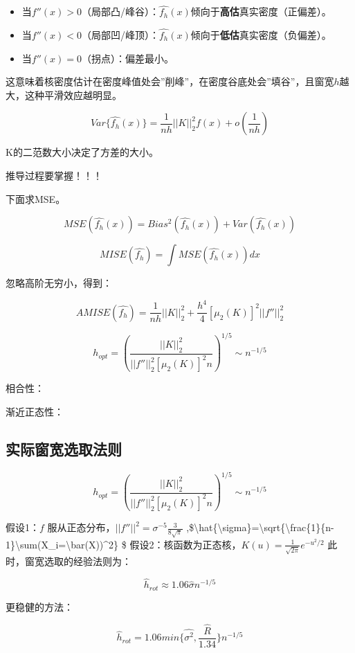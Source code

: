 \documentclass[
]{book}
\providecommand{\tightlist}{%
  \setlength{\itemsep}{0pt}\setlength{\parskip}{0pt}}
\begin{document}
\begin{itemize}
\tightlist
\item
  当\(f''(x) > 0\)（局部凸/峰谷）：\(\hat{f_h}(x)\)倾向于\textbf{高估}真实密度（正偏差）。
\item
  当\(f''(x) < 0\)（局部凹/峰顶）：\(\hat{f_h}(x)\)倾向于\textbf{低估}真实密度（负偏差）。
\item
  当\(f''(x) = 0\)（拐点）：偏差最小。
\end{itemize}

这意味着核密度估计在密度峰值处会''削峰''，在密度谷底处会''填谷''，且窗宽\(h\)越大，这种平滑效应越明显。

\[
Var\{\hat{f_h}(x) \}=\frac{1}{nh}||K||^2_2f(x)+o(\frac{1}{nh})
\]

K的二范数大小决定了方差的大小。

推导过程要掌握！！！

下面求MSE。

\[
MSE(\hat{f_h}(x))=Bias^2(\hat{f_h}(x))+Var(\hat{f_h}(x))
\]

\[
MISE(\hat{f_h})=\int MSE(\hat{f_h}(x))dx
\]

忽略高阶无穷小，得到：

\[
AMISE(\hat{f_h})=\frac{1}{nh}||K||^2_2+\frac{h^4}{4}[\mu_2(K)]^2||f''||^2_2
\]

\[
h_{opt}=(\frac{||K||^2_2}{||f''||^2_2[\mu_2(K)]^2n})^{1/5}\sim n^{-1/5}
\]

相合性：

渐近正态性：

\subsection{实际窗宽选取法则}\label{ux5b9eux9645ux7a97ux5bbdux9009ux53d6ux6cd5ux5219}

\[
h_{opt}=(\frac{||K||^2_2}{||f''||^2_2[\mu_2(K)]^2n})^{1/5}\sim n^{-1/5}
\]

假设1：\(f\) 服从正态分布，\(||f''||^2=\sigma^{-5}\frac{3}{8\sqrt{\pi}}\) ,\$\textbackslash hat\{\textbackslash sigma\}=\textbackslash sqrt\{\textbackslash frac\{1\}\{n-1\}\textbackslash sum(X\_i=\textbackslash bar(X))\^{}2\} \$ 假设2：核函数为正态核，\(K(u)=\frac{1}{\sqrt{2\pi}}e^{-u^2/2}\) 此时，窗宽选取的经验法则为：

\[
\hat{h}_{rot}\approx 1.06\hat{\sigma}n^{-1/5}
\]

更稳健的方法：

\[
\hat{h}_{rot}=1.06 min\{\hat{\sigma^2},\frac{\hat{R}}{1.34} \}n^{-1/5}
\]
\end{document}

